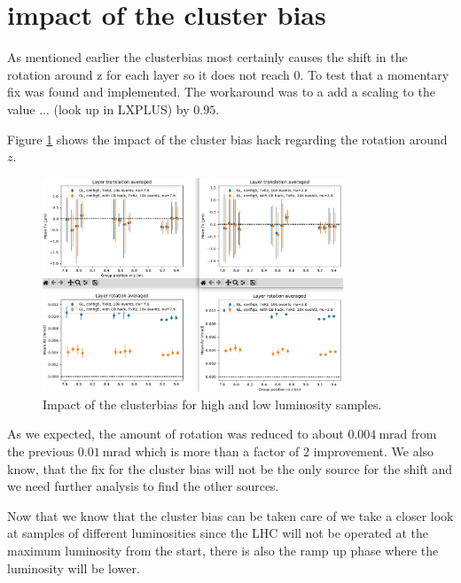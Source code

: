 \section{impact of the cluster bias}

As mentioned earlier the clusterbias most certainly causes the shift in the rotation around z for each layer so it does not reach 0.
To test that a momentary fix was found and implemented. The workaround was to a add a scaling to the value ... (look up in LXPLUS) by $\num{0.95}$.

Figure \ref{fig:cbhack_on_off} shows the impact of the cluster bias hack regarding
the rotation around $z$.


\begin{figure}
  \centering
  \includegraphics[width=0.8\textwidth]{plots/jan_24_2022/compare_with_without_hack.png}
  \caption{Impact of the clusterbias for high and low luminosity samples.}
  \label{fig:cbhack_on_off}
\end{figure}

As we expected, the amount of rotation was reduced to about
$\SI{0.004}{\milli\radian}$ from the previous $\SI{0.01}{\milli\radian}$ which is more than a factor of 2 improvement. We also know, that the fix for the cluster bias will not be the only source for the shift and we need further analysis to find the other sources.

Now that we know that the cluster bias can be taken care of we take a closer look at samples of different luminosities since the LHC will not be operated at the maximum luminosity from the start, there is also the ramp up phase where the luminosity will be lower.

